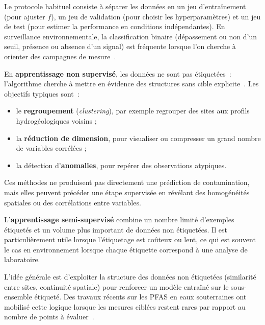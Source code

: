 Le protocole habituel consiste \`a s\'eparer les donn\'ees en un jeu d'entra\^inement (pour ajuster $f$), un jeu de validation (pour choisir les hyperparam\`etres) et un jeu de test (pour estimer la performance en conditions ind\'ependantes).
En surveillance environnementale, la classification binaire (d\'epassement ou non d'un seuil, pr\'esence ou absence d'un signal) est fr\'equente lorsque l'on cherche \`a orienter des campagnes de mesure~\cite{hastie2009elements}.


\label{sec:ml-non-supervise}

En \textbf{apprentissage non supervis\'e}, les donn\'ees ne sont pas \'etiquet\'ees~: l'algorithme cherche \`a mettre en \'evidence des structures sans cible explicite~\cite{hastie2009elements}.
Les objectifs typiques sont~:
\begin{itemize}
    \item le \textbf{regroupement} (\emph{clustering}), par exemple regrouper des sites aux profils hydrog\'eologiques voisins ;
    \item la \textbf{r\'eduction de dimension}, pour visualiser ou compresser un grand nombre de variables corr\'el\'ees ;
    \item la d\'etection d'\textbf{anomalies}, pour rep\'erer des observations atypiques.
\end{itemize}

Ces m\'ethodes ne produisent pas directement une pr\'ediction de contamination, mais elles peuvent pr\'ec\'eder une \'etape supervis\'ee en r\'ev\'elant des homog\'en\'eit\'es spatiales ou des corr\'elations entre variables.


\label{sec:ml-semi-supervise}

L'\textbf{apprentissage semi-supervis\'e} combine un nombre limit\'e d'exemples \'etiquet\'es et un volume plus important de donn\'ees non \'etiquet\'ees.
Il est particuli\`erement utile lorsque l'\'etiquetage est co\^uteux ou lent, ce qui est souvent le cas en environnement lorsque chaque \'etiquette correspond \`a une analyse de laboratoire.

L'id\'ee g\'en\'erale est d'exploiter la structure des donn\'ees non \'etiquet\'ees (similarit\'e entre sites, continuit\'e spatiale) pour renforcer un mod\`ele entra\^in\'e sur le sous-ensemble \'etiquet\'e.
Des travaux r\'ecents sur les PFAS en eaux souterraines ont mobilis\'e cette logique lorsque les mesures cibl\'ees restent rares par rapport au nombre de points \`a \'evaluer~\cite{dong2024pfas}.


